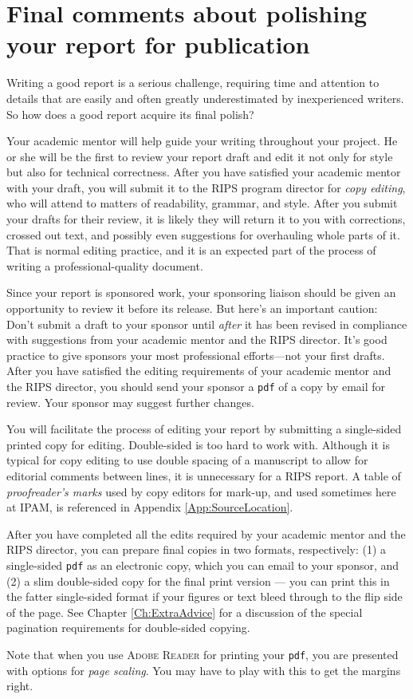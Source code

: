 \chapter{Final comments about polishing your report for publication}\label{Ch:Polishing}

Writing a good report is a serious challenge, requiring time and attention to details that are easily and often greatly underestimated by inexperienced writers.
So how does a good report acquire its final polish?

Your academic mentor will help guide your writing throughout your project.
He or she will be the first to review your report draft and edit it not only for style but also for technical correctness.
After you have satisfied your academic mentor with your draft, you will submit it to the RIPS program director for \emph{copy editing}, who will attend to matters of readability, grammar, and style.
After you submit your drafts for their review, it is likely they will return it to you with corrections, crossed out text, and possibly even suggestions
for overhauling whole parts of it. 
That is normal editing practice, and it is an expected part of the process of writing a professional-quality document.

Since your report is sponsored work, your sponsoring liaison should be given an opportunity to review it before its release.
But here's an important caution:  Don't submit a draft to your sponsor until 
\emph{after} it has been revised in compliance with suggestions from your academic mentor and the RIPS director.
It's good practice to give sponsors your most professional efforts---not your first drafts.
After you have satisfied the editing requirements of your academic mentor and the RIPS director, you should send your sponsor a \texttt{pdf} of a copy by email for review.
Your sponsor may suggest further changes.

\vspace{12pt}
\noindent You will facilitate the process of editing your report by submitting a single-sided printed copy for editing.
Double-sided is too hard to work with.
Although it is typical for copy editing to use double spacing of a manuscript to allow for editorial comments between lines, it is unnecessary for a RIPS report.
A table of {\em proofreader's marks} used by copy editors for mark-up, and used sometimes here at IPAM, is referenced in Appendix \ref{App:SourceLocation}.

After you have completed all the edits required by your academic mentor and the RIPS director, you can prepare final copies in two formats, respectively:
(1) a single-sided \texttt{pdf} as an electronic copy, which you can email to your sponsor, and 
(2) a slim double-sided copy for the final print version --- you can print this in the fatter single-sided format if your figures or text bleed through to the flip side of the page.
See Chapter \ref{Ch:ExtraAdvice} for a discussion of the special pagination requirements for double-sided copying.

Note that when you use \textsc{Adobe Reader} for printing your \texttt{pdf}, you are presented with options for {\em page scaling}.  You may have to play with this to get the  margins right.


\endinput
